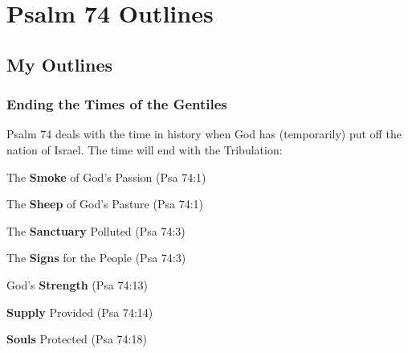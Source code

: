 \section{Psalm 74 Outlines}

\subsection{My Outlines}

\subsubsection{Ending the Times of the Gentiles}
Psalm 74 deals with the time in history when God has (temporarily) put off the nation of Israel. The time will end with the Tribulation:

\begin{compactenum}[I.]
    \item The \textbf{Smoke} of God's Passion (Psa 74:1)
    \item The \textbf{Sheep} of God's Pasture (Psa 74:1)
    \item The \textbf{Sanctuary} Polluted (Psa 74:3)
    \item The \textbf{Signs} for the People (Psa 74:3)
    \item God's \textbf{Strength}  (Psa 74:13)
   \item \textbf{Supply}  Provided (Psa 74:14)
   \item \textbf{Souls}  Protected (Psa 74:18)
\end{compactenum}

